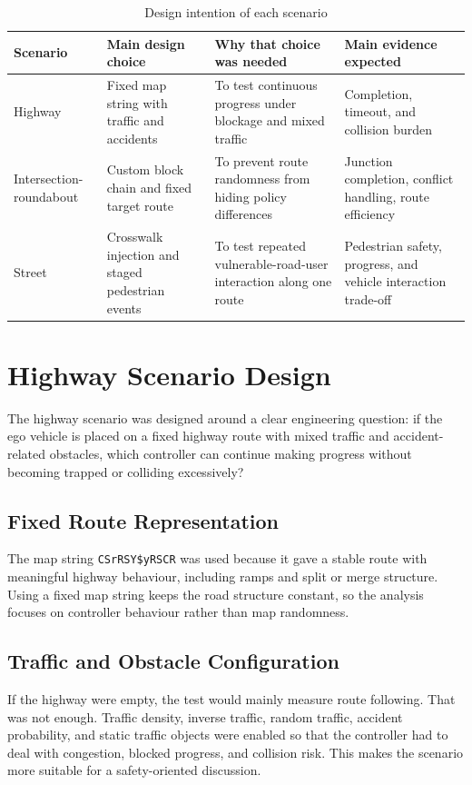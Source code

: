 \documentclass[12pt,a4paper]{report}
\begin{document}
\begin{table}[H]
    \centering
    \footnotesize
    \setlength{\tabcolsep}{4pt}
    \renewcommand{\arraystretch}{1.12}
    \caption{Design intention of each scenario}
    \label{tab:design_intention}
    \begin{tabularx}{\textwidth}{>{\raggedright\arraybackslash}p{2.6cm} X X X}
        \toprule
        Scenario & Main design choice & Why that choice was needed & Main evidence expected \\
        \midrule
        Highway & Fixed map string with traffic and accidents & To test continuous progress under blockage and mixed traffic & Completion, timeout, and collision burden \\
        Intersection-roundabout & Custom block chain and fixed target route & To prevent route randomness from hiding policy differences & Junction completion, conflict handling, route efficiency \\
        Street & Crosswalk injection and staged pedestrian events & To test repeated vulnerable-road-user interaction along one route & Pedestrian safety, progress, and vehicle interaction trade-off \\
        \bottomrule
    \end{tabularx}
\end{table}

\section{Highway Scenario Design}
The highway scenario was designed around a clear engineering question: if the ego vehicle is placed on a fixed highway route with mixed traffic and accident-related obstacles, which controller can continue making progress without becoming trapped or colliding excessively?

\subsection{Fixed Route Representation}
The map string \texttt{CSrRSY\$yRSCR} was used because it gave a stable route with meaningful highway behaviour, including ramps and split or merge structure. Using a fixed map string keeps the road structure constant, so the analysis focuses on controller behaviour rather than map randomness.

\subsection{Traffic and Obstacle Configuration}
If the highway were empty, the test would mainly measure route following. That was not enough. Traffic density, inverse traffic, random traffic, accident probability, and static traffic objects were enabled so that the controller had to deal with congestion, blocked progress, and collision risk. This makes the scenario more suitable for a safety-oriented discussion.
\end{document}
